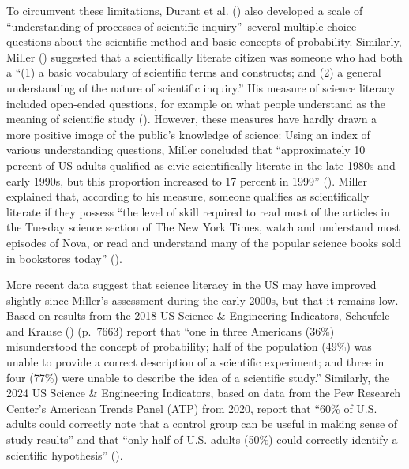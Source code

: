 \documentclass[
  jou,
  floatsintext,
  longtable,
  nolmodern,
  notxfonts,
  notimes,
  colorlinks=true,linkcolor=blue,citecolor=blue,urlcolor=blue]{apa7}
\begin{document}
To circumvent these limitations, Durant et al.
() also
developed a scale of ``understanding of processes of scientific
inquiry''--several multiple-choice questions about the scientific method
and basic concepts of probability. Similarly, Miller
() suggested
that a scientifically literate citizen was someone who had both a ``(1)
a basic vocabulary of scientific terms and constructs; and (2) a general
understanding of the nature of scientific inquiry.'' His measure of
science literacy included open-ended questions, for example on what
people understand as the meaning of scientific study
().
However, these measures have hardly drawn a more positive image of the
public's knowledge of science: Using an index of various understanding
questions, Miller concluded that ``approximately 10 percent of US adults
qualified as civic scientifically literate in the late 1980s and early
1990s, but this proportion increased to 17 percent in 1999''
(). Miller explained that, according to his measure, someone
qualifies as scientifically literate if they possess ``the level of
skill required to read most of the articles in the Tuesday science
section of The New York Times, watch and understand most episodes of
Nova, or read and understand many of the popular science books sold in
bookstores today''
().

More recent data suggest that science literacy in the US may have
improved slightly since Miller's assessment during the early 2000s, but
that it remains low. Based on results from the 2018 US Science \&
Engineering Indicators, Scheufele and Krause
()
(p.~7663) report that ``one in three Americans (36\%) misunderstood the
concept of probability; half of the population (49\%) was unable to
provide a correct description of a scientific experiment; and three in
four (77\%) were unable to describe the idea of a scientific study.''
Similarly, the 2024 US Science \& Engineering Indicators, based on data
from the Pew Research Center's American Trends Panel (ATP) from 2020,
report that ``60\% of U.S. adults could correctly note that a control
group can be useful in making sense of study results'' and that ``only
half of U.S. adults (50\%) could correctly identify a scientific
hypothesis''
().
\end{document}
